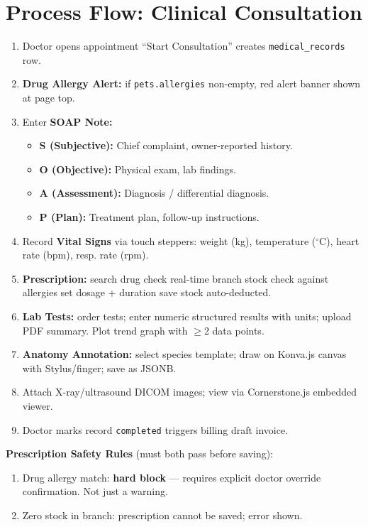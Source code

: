 \documentclass[12pt,a4paper]{report}
\begin{document}
\section{Process Flow: Clinical Consultation}

\begin{enumerate}
  \item Doctor opens appointment \textrightarrow{} ``Start Consultation'' \textrightarrow{} creates \texttt{medical\_records} row.
  \item \textbf{Drug Allergy Alert:} if \texttt{pets.allergies} non-empty, red alert banner shown at page top.
  \item Enter \textbf{SOAP Note:}
    \begin{itemize}
      \item \textbf{S (Subjective):} Chief complaint, owner-reported history.
      \item \textbf{O (Objective):} Physical exam, lab findings.
      \item \textbf{A (Assessment):} Diagnosis / differential diagnosis.
      \item \textbf{P (Plan):} Treatment plan, follow-up instructions.
    \end{itemize}
  \item Record \textbf{Vital Signs} via touch steppers: weight (kg), temperature ($^\circ$C), heart rate (bpm), resp. rate (rpm).
  \item \textbf{Prescription:} search drug \textrightarrow{} check real-time branch stock \textrightarrow{} check against allergies \textrightarrow{} set dosage + duration \textrightarrow{} save \textrightarrow{} stock auto-deducted.
  \item \textbf{Lab Tests:} order tests; enter numeric structured results with units; upload PDF summary. Plot trend graph with $\geq$2 data points.
  \item \textbf{Anatomy Annotation:} select species template; draw on Konva.js canvas with Stylus/finger; save as JSONB.
  \item Attach X-ray/ultrasound DICOM images; view via Cornerstone.js embedded viewer.
  \item Doctor marks record \texttt{completed} \textrightarrow{} triggers billing draft invoice.
\end{enumerate}

\begin{mdframed}[style=ErrorBox]
\textbf{Prescription Safety Rules} (must both pass before saving):
\begin{enumerate}
  \item Drug allergy match: \textbf{hard block} --- requires explicit doctor override confirmation. Not just a warning.
  \item Zero stock in branch: prescription cannot be saved; error shown.
\end{enumerate}
\end{mdframed}
\end{document}
